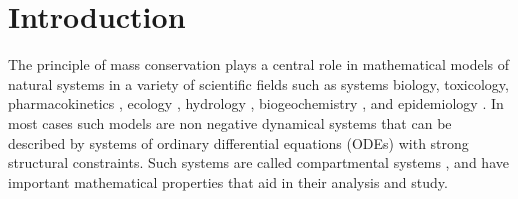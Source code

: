 \section{Introduction}
The principle of mass conservation plays a central role in mathematical models
of natural systems in a variety of scientific fields such as systems biology,
toxicology, pharmacokinetics \cite{Anderson1983} , ecology
\cite{Eriksson1971ARoEaS, Rodhe1979Tellus, Matis1979, Manzoni2009SBB},
hydrology \cite{Nash1957IASH, Botter2011GRL, Harman2014GRL}, biogeochemistry
\cite{Manzoni2009SBB, Sierra2015EM}, and epidemiology \cite{Jacquez1993SIAM}.
In most cases such models are non negative dynamical systems that can be
described by systems of ordinary differential equations (ODEs) with
strong structural constraints.  Such systems are called compartmental systems
\cite{Anderson1983, Jacquez1993SIAM, Walter1999, Haddad2010}
, and have
important mathematical properties that aid in their analysis and study.
\\
